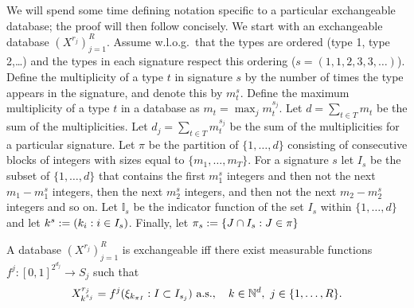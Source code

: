 We will spend some time defining notation specific to a particular exchangeable database; the proof will then follow concisely.
We start with an exchangeable database $(X^{r_j})_{j=1}^R$.
Assume w.l.o.g.\ that the types are ordered (\eg type 1, type 2,\dots) and the types in each signature respect this ordering (\eg $s = (1,1,2,3,3,\dots)$).
Define the multiplicity of a type $t$ in signature $s$ by the number of times the type appears in the signature, and denote this by $m_{t}^s$.
Define the maximum multiplicity of a type $t$ in a database as $m_t = \max_j m_t^{s_j}$.
Let $d = \sum_{t\in T} m_t$ be the sum of the multiplicities.
Let $d_j = \sum_{t\in T} m_t^{s_j}$ be the sum of the multiplicities for a particular signature.
Let $\pi$ be the partition of $\{1,\ldots,d\}$ consisting of consecutive blocks of integers with sizes equal to $\{m_1,\ldots,m_T\}$.
For a signature $s$ let $I_s$ be the subset of $\{1,\ldots,d\}$ that contains the first $m_1^s$ integers and then not the next $m_1 - m_1^s$ integers, then the next $m_2^s$ integers, and then not the next $m_2 - m_2^s$ integers and so on.
Let $\mathbb{I}_s$ be the indicator function of the set $I_s$ within $\{1,\ldots,d\}$ and let $k^s := (k_i : i \in I_s)$.
Finally, let $\pi_s := \{J \cap I_s : J \in \pi\}$

\begin{thm}
  \label{thm:as-database}
  A database $(X^{r_j})_{j=1}^R$ is exchangeable iff there exist measurable functions $f^j : [0,1]^{2^{d_j}} \to S_j$ such that
  \begin{equation}
    X_{k^{s_j}}^{r_j} = f^j(\xi_{k_{\pi I}} : I \subset I_{s_j}) \ \textrm{a.s.}, \quad k \in \mathbb{N}^d, \ j \in \{1,\ldots,R\}.
  \end{equation}
\end{thm}

